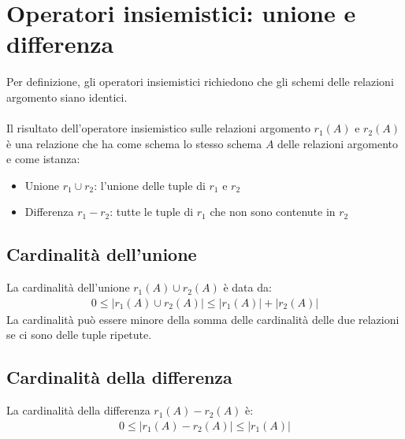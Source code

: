 \section{Operatori insiemistici: unione e differenza}
Per definizione, gli operatori insiemistici richiedono che gli schemi delle relazioni argomento siano identici.\\\\
Il risultato dell'operatore insiemistico sulle relazioni argomento $r_1(A)$ e $r_2(A)$ è una relazione che ha come schema lo stesso schema $A$ delle relazioni argomento e come istanza:
    \begin{itemize}
        \item{Unione $r_1 \cup r_2$: l'unione delle tuple di $r_1$ e $r_2$}
        \item{Differenza $r_1 - r_2$:  tutte le tuple di $r_1$ che non sono contenute in $r_2$}
    \end{itemize}

\subsection{Cardinalità dell'unione}
La cardinalità dell'unione $r_1(A) \cup r_2(A)$ è data da:
    \begin{equation}\begin{aligned}
        0 \leq |r_1(A) \cup r_2(A)| \leq |r_1(A)| + |r_2(A)|
    \end{aligned}\end{equation}
La cardinalità può essere minore della somma delle cardinalità delle due relazioni se ci sono delle tuple ripetute.

\subsection{Cardinalità della differenza}
La cardinalità della differenza $r_1(A) - r_2(A)$ è:
    \begin{equation}\begin{aligned}
        0 \leq |r_1(A) - r_2(A)| \leq |r_1(A)|
    \end{aligned}\end{equation}

